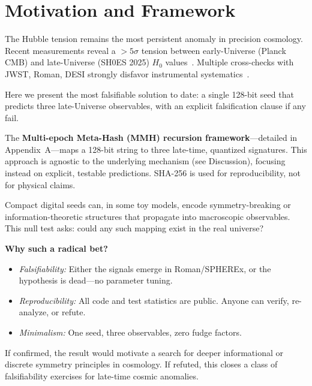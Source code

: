 \documentclass[11pt,a4paper]{article}
\begin{document}
\setcounter{page}{1}

\FloatBarrier
\section{Motivation and Framework}
The Hubble tension remains the most persistent anomaly in precision cosmology. Recent measurements reveal a $>5\sigma$ tension between early-Universe (Planck CMB) and late-Universe (SH0ES 2025) $H_0$ values~\cite{Riess2024}. Multiple cross-checks with JWST, Roman, DESI strongly disfavor instrumental systematics~\cite{DESI2025,TRGB2025}. 

Here we present the most falsifiable solution to date: a single 128-bit seed that predicts three late-Universe observables, with an explicit falsification clause if any fail.

The \textbf{Multi-epoch Meta-Hash (MMH) recursion framework}---detailed in Appendix~A---maps a 128-bit string to three late-time, quantized signatures. This approach is agnostic to the underlying mechanism (see Discussion), focusing instead on explicit, testable predictions. SHA-256 is used for reproducibility, not for physical claims.

Compact digital seeds can, in some toy models, encode symmetry-breaking or information-theoretic structures that propagate into macroscopic observables. This null test asks: could any such mapping exist in the real universe?

\vspace{0.6em}
\noindent\textbf{Why such a radical bet?}
\begin{itemize}
    \item \textit{Falsifiability:} Either the signals emerge in Roman/SPHEREx, or the hypothesis is dead---no parameter tuning.
    \item \textit{Reproducibility:} All code and test statistics are public. Anyone can verify, re-analyze, or refute.
    \item \textit{Minimalism:} One seed, three observables, zero fudge factors.
\end{itemize}

If confirmed, the result would motivate a search for deeper informational or discrete symmetry principles in cosmology. If refuted, this closes a class of falsifiability exercises for late-time cosmic anomalies.

\FloatBarrier
\end{document}
